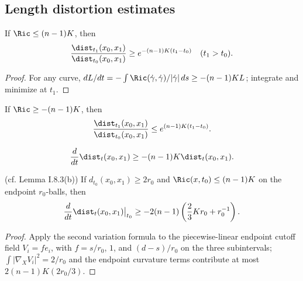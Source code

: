 \subsection{Length distortion estimates}
\label{secI.8.3}
\begin{lemma}
  \label{lem:kl-length-distortion-estimates-length-distortion-estimates-lemma}
  \label{crudelemma}
If $\Ric\le(n-1)K$, then
\begin{equation}{\dist_{t_1}(x_0,x_1)\over\dist_{t_0}(x_0,x_1)}\ge e^{-(n-1)K(t_1-t_0)}\quad(t_1>t_0).
\end{equation}
\end{lemma}
\begin{proof}
\sketch
For any curve, $dL/dt=-\int\Ric(\dot\gamma,\dot\gamma)/|\dot\gamma|\,ds\ge-(n-1)KL$;
integrate and minimize at $t_1$.
\end{proof}
\begin{remark}
  \label{rem:kl-length-distortion-estimates-structural-remark-length-distortion-estimates}
  \label{similar}
If $\Ric\ge-(n-1)K$, then
\begin{equation}{\dist_{t_1}(x_0,x_1)\over\dist_{t_0}(x_0,x_1)}\le e^{(n-1)K(t_1-t_0)}.\end{equation}
\end{remark}
\begin{equation}\label{conclusion}{d\over dt}\dist_t(x_0,x_1)\ge-(n-1)K\dist_t(x_0,x_1).\end{equation}
\begin{lemma}
  \label{lem:kl-length-distortion-estimates-distance-distortion-lemma}
  \label{distancedist} (cf. Lemma I.8.3(b))
If $d_{t_0}(x_0,x_1)\ge2r_0$ and $\Ric(x,t_0)\le(n-1)K$ on the endpoint
$r_0$-balls, then
\begin{equation}{d\over dt}\dist_t(x_0,x_1)\big|_{t_0}\ge-2(n-1)\left({2\over3}Kr_0+r_0^{-1}\right).
\end{equation}
\end{lemma}
\begin{proof}
\sketch
Apply the second variation formula to the piecewise-linear endpoint cutoff field
$V_i=f e_i$, with $f=s/r_0$, $1$, and $(d-s)/r_0$ on the three subintervals;
$\int|\nabla_XV_i|^2=2/r_0$ and the endpoint curvature terms contribute at most
$2(n-1)K(2r_0/3)$.
\end{proof}

